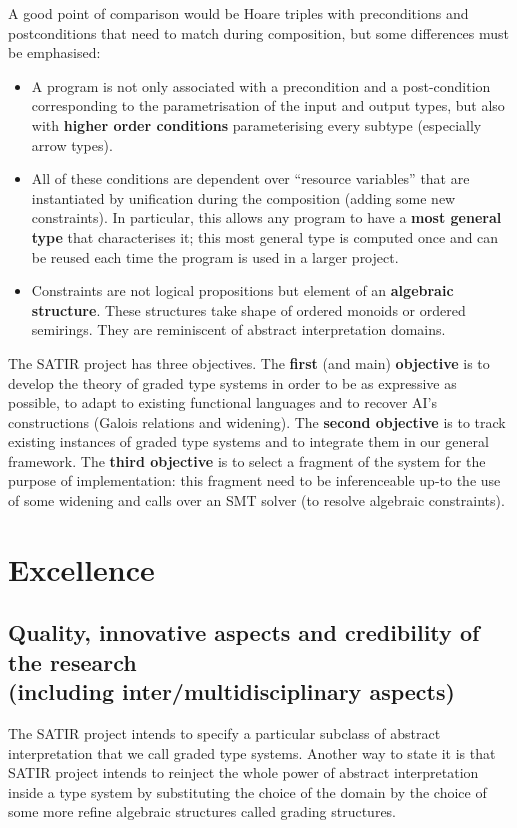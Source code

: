 \documentclass{article}[11pt]
\begin{document}
A good point of comparison would be Hoare triples with preconditions and postconditions that need to match during composition, but some differences must be emphasised:
\begin{itemize}
\item A program is not only associated with a precondition and a post-condition corresponding to the parametrisation of the input and output types, but also with {\bf higher order conditions} parameterising every subtype (especially arrow types).
\item All of these conditions are dependent over ``resource variables'' that are instantiated by unification during the composition (adding some new constraints). In particular, this allows any program to have a {\bf most general type} that characterises it; this most general type is computed once and can be reused each time the program is used in a larger project.
\item Constraints are not logical propositions but element of an {\bf algebraic structure}. These structures take shape of ordered monoids or ordered semirings. They are reminiscent of abstract interpretation domains.
\end{itemize}

The SATIR project has three objectives. The {\bf first} (and main) {\bf objective} is to develop the theory of graded type systems in order to be as expressive as possible, to adapt to existing functional languages and to recover AI's constructions (Galois relations and widening). The {\bf second objective} is to track existing instances of graded type systems and to integrate them in our general framework. The {\bf third objective} is to select a fragment of the system for the purpose of implementation: this fragment need to be inferenceable up-to the use of some widening and calls over an SMT solver (to resolve algebraic constraints).

\section{Excellence}
\subsection{Quality, innovative aspects and credibility of the research\\  (including inter/multidisciplinary aspects)}

The SATIR project intends to specify a particular subclass of abstract interpretation that we call graded type systems. Another way to state it is that SATIR project intends to reinject the whole power of abstract interpretation inside a type system by substituting the choice of the domain by the choice of some more refine algebraic structures called grading structures.
\end{document}
